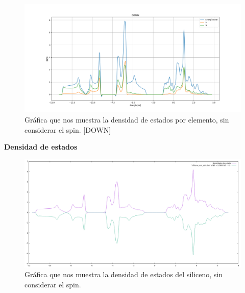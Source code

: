 \begin{frame}
    \begin{figure}[H]
        \centering
        \includegraphics[scale=0.3]{images_silicano/Densidad_estados_sin_spin_down_elementos.png}
        \caption{Gráfica que nos muestra la densidad de estados por elemento, sin considerar el spin. [DOWN]}
    \end{figure}    
\end{frame}



\begin{frame}
    \textbf{Densidad de estados }
    \begin{figure}[H]
        \centering
        \includegraphics[scale=0.25]{images_silicano/Densidad_estados_con_spin.png}
        \caption{Gráfica que nos muestra la densidad de estados del siliceno, sin considerar el spin.}
    \end{figure}
\end{frame}


